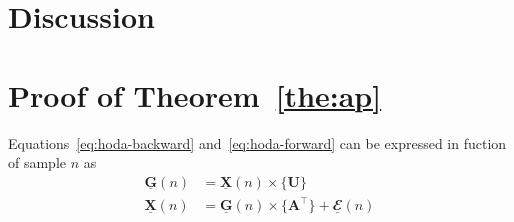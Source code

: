 \documentclass[twocolumn]{article}
\newcommand{\ten}[1]{\underline{\mathbf{#1}}} %
\newcommand{\mat}[1]{\mathbf{#1}} %
\newcommand{\mmpr}[1]{\times\{#1\}} %
\begin{document}
\section{Discussion}


\printbibliography

\appendix
\section{Proof of Theorem~\ref{the:ap}}

Equations~\ref{eq:hoda-backward} and~\ref{eq:hoda-forward} can be expressed in fuction
of sample $n$ as
\begin{subequations}
	\label{eq:proj-n}
	\begin{align}
		\ten{G}(n) & = \ten{X}(n)\mmpr{\mat{U}}
		\label{eq:proj-back-n}                                                   \\
		\ten{X}(n) & = \ten{G}(n)\mmpr{\mat{A}^\intercal}+\ten{\mathbfcal{E}}(n)
		\label{eq:proj-fwd-n}
	\end{align}
\end{subequations}
\end{document}
